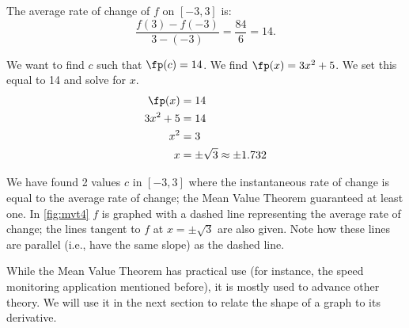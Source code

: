 {The average rate of change of $f$ on $[-3,3]$ is:
		$$\frac{f(3)-f(-3)}{3-(-3)} = \frac{84}{6} = 14.$$
		
We want to find $c$ such that $\fp(c) = 14$. We find $\fp(x) = 3x^2+5$. We set this equal to 14 and solve for $x$. 
		\begin{align*}
		\fp(x) &= 14 \\
		3x^2 +5 &= 14\\
		x^2  &= 3\\
		x &= \pm \sqrt{3} \approx \pm 1.732
		\end{align*}
		

We have found 2 values $c$ in $[-3,3]$ where the instantaneous rate of change is equal to the average rate of change; the Mean Value Theorem guaranteed at least one. In \autoref{fig:mvt4} $f$ is graphed with a dashed line representing the average rate of change; the lines tangent to $f$ at $x=\pm \sqrt{3}$ are also given. Note how these lines are parallel (i.e., have the same slope) as the dashed line.}

While the Mean Value Theorem has practical use (for instance, the speed monitoring application mentioned before), it is mostly used to advance other theory. We will use it in the next section to relate  the shape of a graph to its derivative.\\

%

